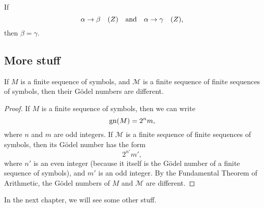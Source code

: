 \begin{theorem}
    If
    \begin{equation*}
        \alpha \to \beta\quad (Z) \qand \alpha \to \gamma\quad
        (Z),
    \end{equation*}
    then $\beta = \gamma$.
\end{theorem}

\subsection{More stuff}

\begin{theorem}
    If $M$ is a finite sequence of symbols, and $\mathcal{M}$ is
    a finite sequence of finite sequences of symbols, then their
    Gödel numbers are different.
\end{theorem}

\begin{proof}
    If $M$ is a finite sequence of symbols, then we can write
    \begin{equation*}
        \operatorname{gn}(M)=2^n m,
    \end{equation*}
    where $n$ and $m$ are odd integers. If $\mathcal{M}$ is a
    finite sequence of finite sequences of symbols, then its
    Gödel number has the form
    \begin{equation*}
        2^{n'}m',
    \end{equation*}
    where $n'$ is an even integer (because it itself is the Gödel
    number of a finite sequence of symbols), and $m'$ is an odd
    integer. By the Fundamental Theorem of Arithmetic, the Gödel
    numbers of $M$ and $\mathcal{M}$ are different.
\end{proof}

In the next chapter, we will see some other stuff.

